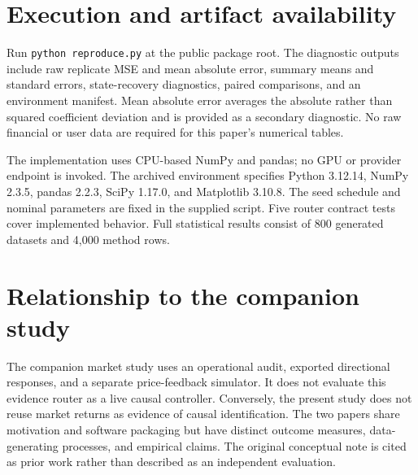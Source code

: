 \section{Execution and artifact availability}
Run \texttt{python reproduce.py} at the public package root. The diagnostic outputs include raw replicate MSE and mean absolute error, summary means and standard errors, state-recovery diagnostics, paired comparisons, and an environment manifest. Mean absolute error averages the absolute rather than squared coefficient deviation and is provided as a secondary diagnostic. No raw financial or user data are required for this paper's numerical tables.

The implementation uses CPU-based NumPy and pandas; no GPU or provider endpoint is invoked. The archived environment specifies Python 3.12.14, NumPy 2.3.5, pandas 2.2.3, SciPy 1.17.0, and Matplotlib 3.10.8. The seed schedule and nominal parameters are fixed in the supplied script. Five router contract tests cover implemented behavior. Full statistical results consist of 800 generated datasets and 4,000 method rows.

\section{Relationship to the companion study}
The companion market study uses an operational audit, exported directional responses, and a separate price-feedback simulator. It does not evaluate this evidence router as a live causal controller. Conversely, the present study does not reuse market returns as evidence of causal identification. The two papers share motivation and software packaging but have distinct outcome measures, data-generating processes, and empirical claims. The original conceptual note is cited as prior work rather than described as an independent evaluation.
